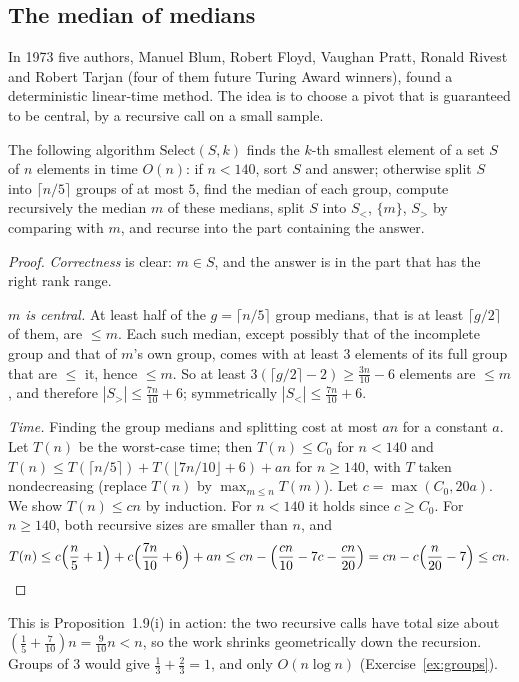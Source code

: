 \subsection*{The median of medians}

In 1973 five authors, Manuel Blum, Robert Floyd, Vaughan Pratt, Ronald Rivest and Robert Tarjan (four of them future Turing Award winners),
found a deterministic linear-time method. The idea is to choose a pivot that is guaranteed to be central, by a recursive call on a small sample.

\begin{theorem}\label{thm:bfprt}
The following algorithm $\mathrm{Select}(S,k)$ finds the $k$-th smallest element of a set $S$ of $n$ elements in time $O(n)$:
if $n<140$, sort $S$ and answer; otherwise split $S$ into $\lceil n/5\rceil$ groups of at most $5$, find the median of each group, compute recursively the median $m$ of
these medians, split $S$ into $S_<$, $\{m\}$, $S_>$ by comparing with $m$, and recurse into the part containing the answer.
\end{theorem}
\begin{proof}
\emph{Correctness} is clear: $m\in S$, and the answer is in the part that has the right rank range.

\emph{$m$ is central.} At least half of the $g=\lceil n/5\rceil$ group medians, that is at least $\lceil g/2\rceil$ of them, are $\le m$. Each such median, except possibly that of the
incomplete group and that of $m$'s own group, comes with at least $3$ elements of its full group that are $\le$ it, hence $\le m$. So at least
$3(\lceil g/2\rceil-2)\ge\frac{3n}{10}-6$ elements are $\le m$, and therefore $|S_>|\le\frac{7n}{10}+6$; symmetrically $|S_<|\le\frac{7n}{10}+6$.

\emph{Time.} Finding the group medians and splitting cost at most $an$ for a constant $a$. Let $T(n)$ be the worst-case time; then $T(n)\le C_0$ for $n<140$ and
$T(n)\le T(\lceil n/5\rceil)+T(\lfloor7n/10\rfloor+6)+an$ for $n\ge140$, with $T$ taken nondecreasing (replace $T(n)$ by $\max_{m\le n}T(m)$). Let $c=\max(C_0,20a)$. We show $T(n)\le cn$ by
induction. For $n<140$ it holds since $c\ge C_0$. For $n\ge140$, both recursive sizes are smaller than $n$, and
\[
T(n)\le c\Bigl(\frac n5+1\Bigr)+c\Bigl(\frac{7n}{10}+6\Bigr)+an\le cn-\Bigl(\frac{cn}{10}-7c-\frac{cn}{20}\Bigr)=cn-c\Bigl(\frac n{20}-7\Bigr)\le cn.
\]
\end{proof}

This is Proposition~1.9(i) in action: the two recursive calls have total size about $(\frac15+\frac7{10})n=\frac9{10}n<n$, so the work shrinks geometrically down the recursion.
Groups of $3$ would give $\frac13+\frac23=1$, and only $O(n\log n)$ (Exercise~\ref{ex:groups}).

